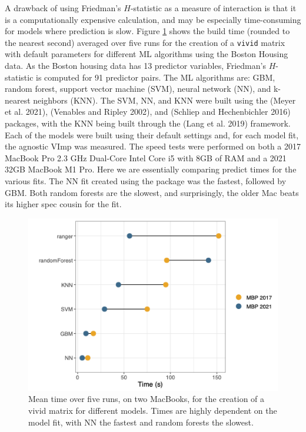 A drawback of using Friedman's \(H\)-statistic as a measure of interaction is that it is a computationally expensive calculation, and may be especially time-consuming for models where prediction is slow.
Figure \ref{fig:speedtest}
shows the build time (rounded to the nearest second) averaged over five runs for the creation of a \texttt{vivid} matrix with default parameters for different ML algorithms using the Boston Housing data. As the Boston housing data has 13 predictor variables, Friedman's \(H\)-statistic is computed for 91 predictor pairs. The ML algorithms are: GBM, random forest, support vector machine (SVM), neural network (NN), and k-nearest neighbors (KNN). The SVM, NN, and KNN were built using the  (Meyer et al. 2021),  (Venables and Ripley 2002), and  (Schliep and Hechenbichler 2016) packages, with the KNN being built through the  (Lang et al. 2019) framework. Each of the models were built using their default settings and, for each model fit, the agnostic VImp was measured. The speed tests were performed on both a 2017 MacBook Pro 2.3 GHz Dual-Core Intel Core i5 with 8GB of RAM and a 2021 32GB MacBook M1 Pro. Here we are essentially comparing predict times for the various fits. The NN fit created using the  package was the fastest, followed by GBM. Both random forests are the slowest, and surprisingly, the older Mac beats its higher spec cousin for the  fit.

\begin{figure}

{\centering \includegraphics[width=0.6\linewidth]{speedTestsplot} 

}

\caption{Mean time over five runs, on two MacBooks, for the creation of a vivid matrix for different models. Times are highly dependent on the model fit, with NN the fastest and random forests the slowest.}\label{fig:speedtest}
\end{figure}

